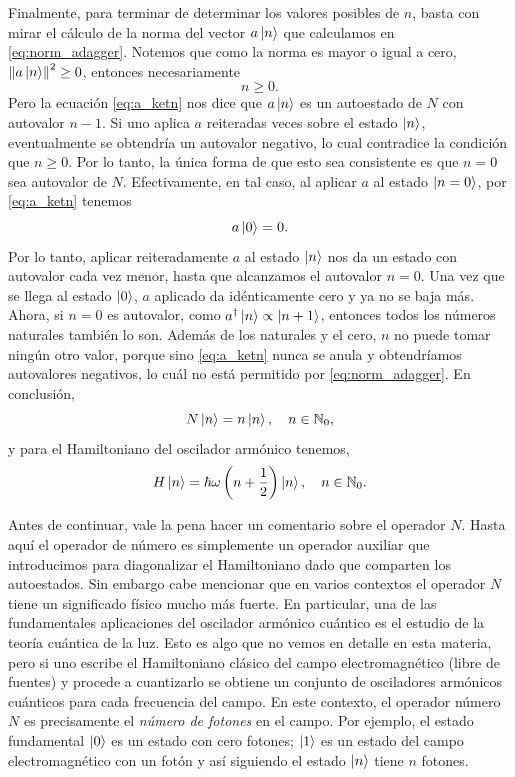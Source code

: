 \documentclass[10pt, a4paper]{article}
\newcommand{\N}{N}
\numberwithin{equation}{subsection}
\begin{document}
Finalmente, para terminar de determinar los valores posibles de $n$, basta con
mirar el cálculo de la norma del vector $a\ket{n}$ que calculamos en
\eqref{eq:norm_adagger}. Notemos que como la norma es mayor o igual a cero,
$\norm{a\ket{n}}^2 \geq 0$, entonces necesariamente
\begin{equation}
  n \geq 0.
\end{equation}
Pero la ecuación \eqref{eq:a_ketn} nos dice que $a\ket{n}$ es un autoestado de
$\N$ con autovalor $n-1$. Si uno aplica $a$ reiteradas veces sobre el estado
$\ket{n}$, eventualmente se obtendría un autovalor negativo, lo cual contradice
la condición que $n \geq 0$. Por lo tanto, la única forma de que esto sea
consistente es que $n = 0$ sea autovalor de $\N$. Efectivamente, en tal caso,
al aplicar $a$ al estado $\ket{n = 0}$, por \eqref{eq:a_ketn} tenemos
\begin{equation}
  a\ket{0} = 0.
\end{equation}
Por lo tanto, aplicar reiteradamente $a$ al estado $\ket{n}$ nos da un estado
con autovalor cada vez menor, hasta que alcanzamos el autovalor $n = 0$. Una
vez que se llega al estado $\ket{0}$, $a$ aplicado da idénticamente cero y ya
no se baja más. Ahora, si $n = 0$ es autovalor, como $a^\dagger\ket{n} \propto
\ket{n+1}$, entonces todos los números naturales también lo son. Además de los
naturales y el cero, $n$ no puede tomar ningún otro valor, porque sino
\eqref{eq:a_ketn} nunca se anula y obtendríamos autovalores negativos, lo cuál
no está permitido por \eqref{eq:norm_adagger}. En conclusión,
\begin{equation}
  \N\ket{n} = n\ket{n}, \quad n\in\Naturals_0,
\end{equation}
y para el Hamiltoniano del oscilador armónico tenemos,
\begin{equation}
  H\ket{n} = \hbar\omega\left(n + \frac{1}{2}\right)\ket{n}, \quad
    n\in\mathbb{N}_0.
\end{equation}

\bigbreak


\bigbreak

Antes de continuar, vale la pena hacer un comentario sobre el operador $N$.
Hasta aquí el operador de número es simplemente un operador auxiliar que
introducimos para diagonalizar el Hamiltoniano dado que comparten los
autoestados. Sin embargo cabe mencionar que en varios contextos el operador $N$
tiene un significado físico mucho más fuerte. En particular, una de las
fundamentales aplicaciones del oscilador armónico cuántico es el estudio de la
teoría cuántica de la luz. Esto es algo que no vemos en detalle en esta
materia, pero si uno escribe el Hamiltoniano clásico del campo electromagnético
(libre de fuentes) y procede a cuantizarlo se obtiene un conjunto de
osciladores armónicos cuánticos para cada frecuencia del campo. En este
contexto, el operador número $N$ es precisamente el \emph{número de fotones} en
el campo. Por ejemplo, el estado fundamental $\ket{0}$ es un estado con cero
fotones; $\ket{1}$ es un estado del campo electromagnético con un fotón y así
siguiendo el estado $\ket{n}$ tiene $n$ fotones.
\end{document}

